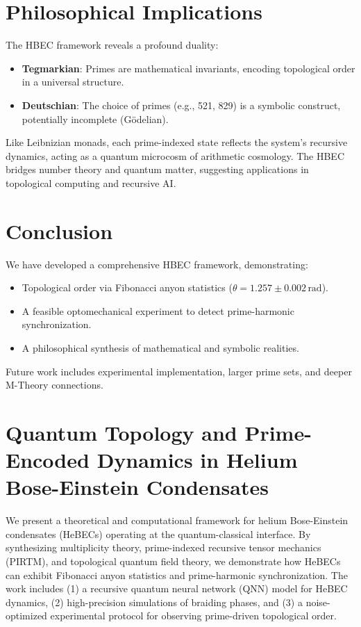 \documentclass{article}
\theoremstyle{plain}
\begin{document}
\section{Philosophical Implications}
The HBEC framework reveals a profound duality:
\begin{itemize}
    \item \textbf{Tegmarkian}: Primes are mathematical invariants, encoding topological order in a universal structure.
    \item \textbf{Deutschian}: The choice of primes (e.g., 521, 829) is a symbolic construct, potentially incomplete (Gödelian).
\end{itemize}

Like Leibnizian monads, each prime-indexed state reflects the system’s recursive dynamics, acting as a quantum microcosm of arithmetic cosmology. The HBEC bridges number theory and quantum matter, suggesting applications in topological computing and recursive AI.

\section{Conclusion}
We have developed a comprehensive HBEC framework, demonstrating:
\begin{itemize}
    \item Topological order via Fibonacci anyon statistics (\(\theta = 1.257 \pm 0.002 \, \text{rad}\)).
    \item A feasible optomechanical experiment to detect prime-harmonic synchronization.
    \item A philosophical synthesis of mathematical and symbolic realities.
\end{itemize}

Future work includes experimental implementation, larger prime sets, and deeper M-Theory connections.


\section{Quantum Topology and Prime-Encoded Dynamics in Helium Bose-Einstein Condensates}

We present a theoretical and computational framework for helium Bose-Einstein condensates (HeBECs) operating at the quantum-classical interface. By synthesizing multiplicity theory, prime-indexed recursive tensor mechanics (PIRTM), and topological quantum field theory, we demonstrate how HeBECs can exhibit Fibonacci anyon statistics and prime-harmonic synchronization. The work includes (1) a recursive quantum neural network (QNN) model for HeBEC dynamics, (2) high-precision simulations of braiding phases, and (3) a noise-optimized experimental protocol for observing prime-driven topological order.
\end{document}
